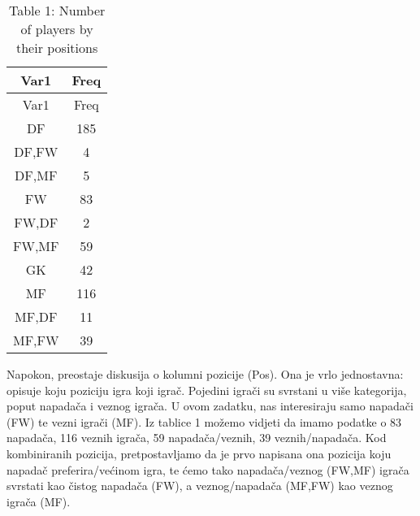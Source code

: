 \documentclass[
]{article}
\newenvironment{Shaded}{\begin{snugshade}}{\end{snugshade}}
\newcommand{\NormalTok}[1]{#1}
\newcommand{\OtherTok}[1]{\textcolor[rgb]{0.56,0.35,0.01}{#1}}
\newcommand{\SpecialCharTok}[1]{\textcolor[rgb]{0.00,0.00,0.00}{#1}}
\newcommand{\StringTok}[1]{\textcolor[rgb]{0.31,0.60,0.02}{#1}}
\begin{document}
\begin{longtable}[]{@{}cc@{}}
\caption{Table 1: Number of players by their positions}\tabularnewline
\toprule()
Var1 & Freq \\
\midrule()
\endfirsthead
\toprule()
Var1 & Freq \\
\midrule()
\endhead
DF & 185 \\
DF,FW & 4 \\
DF,MF & 5 \\
FW & 83 \\
FW,DF & 2 \\
FW,MF & 59 \\
GK & 42 \\
MF & 116 \\
MF,DF & 11 \\
MF,FW & 39 \\
\bottomrule()
\end{longtable}

Napokon, preostaje diskusija o kolumni pozicije (Pos). Ona je vrlo
jednostavna: opisuje koju poziciju igra koji igrač. Pojedini igrači su
svrstani u više kategorija, poput napadača i veznog igrača. U ovom
zadatku, nas interesiraju samo napadači (FW) te vezni igrači (MF). Iz
tablice 1 možemo vidjeti da imamo podatke o 83 napadača, 116 veznih
igrača, 59 napadača/veznih, 39 veznih/napadača. Kod kombiniranih
pozicija, pretpostavljamo da je prvo napisana ona pozicija koju napadač
preferira/većinom igra, te ćemo tako napadača/veznog (FW,MF) igrača
svrstati kao čistog napadača (FW), a veznog/napadača (MF,FW) kao veznog
igrača (MF).

\begin{Shaded}
\end{Shaded}
\end{document}
